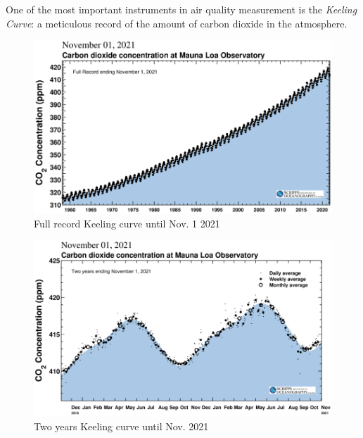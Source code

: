 		One of the most important instruments in air quality measurement is the \textit{Keeling Curve}: a meticulous record of the amount of carbon dioxide in the atmosphere.
				
		\noindent
		\begin{minipage}{0.49\textwidth}%
			\begin{figure}[H]
				\centering
				\includegraphics[width=\textwidth]{resources/img/chap2/keeling}
				\caption{Full record Keeling curve until Nov. 1 2021}
				\label{keeling_full}
			\end{figure}
		\end{minipage}%
		\hfill%
		\begin{minipage}{0.49\textwidth}\raggedright
			\begin{figure}[H]
				\centering				
				\includegraphics[width=\textwidth]{resources/img/chap2/mlo_two_years}
				\caption{Two years Keeling curve until Nov. 2021}
				\label{keeling_two}
			\end{figure}
		\end{minipage}
		\newline
		
